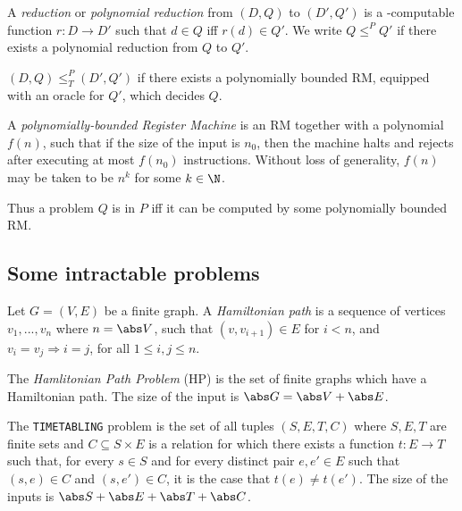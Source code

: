\documentclass{article}
\begin{document}
\begin{definition}
    A \ptime \emph{reduction} or \emph{polynomial reduction} from $(D,Q)$ to $(D',Q')$ is 
    a \ptime-computable function $r:D\to D'$ such that $d\in Q$ iff $r(d)\in Q'$.
    We write $Q\leq^P Q'$ if there exists a polynomial reduction from $Q$ to $Q'$.
\end{definition}

\begin{definition}
    $(D,Q)\leq^P_T (D',Q')$ if there exists a polynomially bounded RM, equipped with an oracle 
    for $Q'$, which decides $Q$.
\end{definition}

\begin{definition}
    A \emph{polynomially-bounded Register Machine} is an RM together with a polynomial $f(n)$,
    such that if the size of the input is $n_0$, then the machine halts and rejects after 
    executing at most $f(n_0)$ instructions. Without loss of generality, $f(n)$ may be taken to be
    $n^k$ for some $k\in\N$.

    Thus a problem $Q$ is in $P$ iff it can be computed by some polynomially bounded RM.
\end{definition}

\subsection{Some intractable problems}

\begin{definition}
    Let $G=(V,E)$ be a finite graph. A \emph{Hamiltonian path} is a sequence of vertices 
    $v_1,...,v_n$ where $n=\abs V$, such that $(v,v_{i+1})\in E$ for $i<n$, and $v_i=v_j 
    \Rightarrow i=j$, for all $1\leq i,j\leq n$.

    The \emph{Hamlitonian Path Problem} (HP) is the set of finite graphs which have a Hamiltonian
    path. The size of the input is $\abs G = \abs V + \abs E$.
\end{definition}

\begin{definition}
    The \texttt{TIMETABLING} problem is the set of all tuples $(S,E,T,C)$ where $S,E,T$ are finite 
    sets and $C\subseteq S\times E$ is a relation for which there exists a function $t:E\to T$
    such that, for every $s\in S$ and for every distinct pair $e,e'\in E$ such that $(s,e)\in C$
    and $(s,e')\in C$, it is the case that $t(e)\not=t(e')$. 
    The size of the inputs is $\abs S + \abs E + \abs T + \abs C$.
\end{definition}
\end{document}
